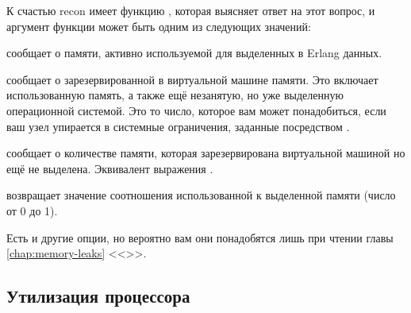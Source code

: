 \documentclass[11pt, oneside]{book}   	%
\newcommand\NamedRef[1]{\ref{#1} <<\nameref{#1}>>}
\begin{document}
К счастью recon имеет функцию , которая выясняет ответ на этот вопрос, и аргумент функции может быть одним из следующих значений:

\begin{itemize*}
	\item {} сообщает о памяти, активно используемой для выделенных в Erlang данных.
	\item {} сообщает о зарезервированной в виртуальной машине памяти. Это включает использованную память, а также ещё незанятую, но уже выделенную операционной системой. Это то число, которое вам может понадобиться, если ваш узел упирается в системные ограничения, заданные посредством .
	\item {} сообщает о количестве памяти, которая зарезервирована виртуальной машиной но ещё не выделена. Эквивалент выражения .
	\item {} возвращает значение соотношения использованной к выделенной памяти (число от 0 до 1).
\end{itemize*}

Есть и другие опции, но вероятно вам они понадобятся лишь при чтении главы \NamedRef{chap:memory-leaks}.

\subsection{Утилизация процессора}
\label{subsec:global-cpu}
\end{document}
